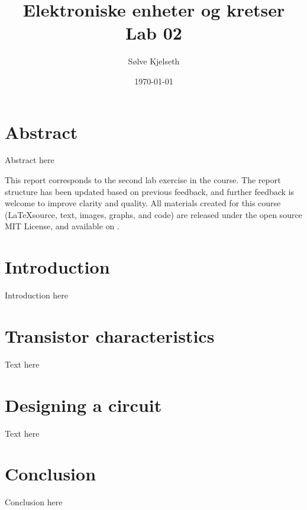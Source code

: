 \documentclass{article}
\title{\fontsize{24}{36}\selectfont Elektroniske enheter og kretser\\ %
Lab 02} %
\author{{\ttfamily Sølve Kjelseth}} %
\date{\today} %
\begin{document}
\maketitle %

\section{Abstract} %
Abstract here


\vfill %
This report corresponds to the second lab exercise in the course. The report structure has been updated based on previous feedback, and further feedback is welcome to improve clarity and quality. All materials created for this course (\LaTeX source, text, images, graphs, and code) are released under the open source MIT License, and available on .







\clearpage

\tableofcontents %
\hfill
\listoffigures %
\hfill
\listoftables %

\section{Introduction}
Introduction here



\section{Transistor characteristics}
Text here


\section{Designing a circuit}
Text here



\section{Conclusion}
Conclusion here

\end{document}
